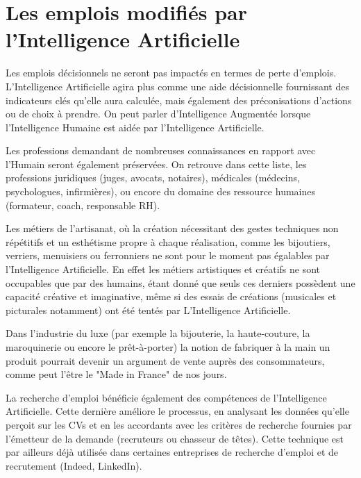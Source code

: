     \section{Les emplois modifiés par l'Intelligence Artificielle}

    Les emplois décisionnels ne seront pas impactés en termes de perte d'emplois. L'Intelligence Artificielle agira plus
    comme une aide décisionnelle fournissant des indicateurs clés qu'elle aura calculée, mais également des préconisations
    d'actions ou de choix à prendre. On peut parler d'Intelligence Augmentée lorsque l'Intelligence Humaine est aidée par
    l'Intelligence Artificielle. \newline

    Les professions demandant de nombreuses connaissances en rapport avec l'Humain seront également préservées.
    On retrouve dans cette liste, les professions juridiques (juges, avocats, notaires), médicales (médecins, psychologues, infirmières),
    ou encore du domaine des ressource humaines (formateur, coach, responsable RH). \newline

    Les métiers de l'artisanat, où la création nécessitant des gestes techniques non répétitifs et un esthétisme propre à chaque réalisation,
    comme les bijoutiers, verriers, menuisiers ou ferronniers ne sont pour le moment pas égalables par l'Intelligence Artificielle.
    En effet les métiers artistiques et créatifs ne sont occupables que par des humains, étant donné que seuls ces derniers
    possèdent une capacité créative et imaginative, même si des essais de créations (musicales et picturales notamment) ont été tentés par
    L'Intelligence Artificielle. \newline

    Dans l'industrie du luxe (par exemple la bijouterie, la haute-couture, la maroquinerie ou encore le prêt-à-porter) la notion de fabriquer à la main
    un produit pourrait devenir un argument de vente auprès des consommateurs, comme peut l'être le "Made in France" de nos jours. \newline

    La recherche d'emploi bénéficie également des compétences de l'Intelligence Artificielle. Cette dernière améliore le processus, en analysant
    les données qu'elle perçoit sur les CVs et en les accordants avec les critères de recherche fournies par l'émetteur de la demande (recruteurs
    ou chasseur de têtes). Cette technique est par ailleurs déjà utilisée dans certaines entreprises de recherche d'emploi et de recrutement
    (Indeed, LinkedIn). \newline

